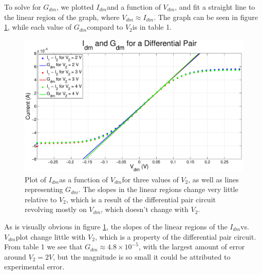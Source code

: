 \documentclass{article}
\newcommand{\Vtwo}{{$V_{2}$}}
\newcommand{\gdm}{{$G_{dm}$}}
\newcommand{\Vdm}{{$V_{dm}$}}
\newcommand{\Idm}{{$I_{dm}$}}
\begin{document}
To solve for \gdm, we plotted \Idm and a function of \Vdm, and fit a straight line to the linear region of the graph, where $V_{dm} \approx I_{dm}$. The graph can be seen in figure \ref{fig:gdm}, while each value of \gdm compard to \Vtwo is in table 1.

\begin{figure}[H]
\centering
\includegraphics[width=\linewidth]{./Figures/Gdm.eps}
\caption{Plot of \Idm as a function of \Vdm for three values of \Vtwo, as well as lines representing \gdm. The slopes in the linear regions change very little relative to \Vtwo, which is a result of the differential pair circuit revolving mostly on \Vdm, which doesn't change with \Vtwo.}
\label{fig:gdm}
\end{figure}


As is visually obvious in figure \ref{fig:gdm}, the slopes of the linear regions of the \Idm vs. \Vdm plot change little with \Vtwo, which is a property of the differential pair circuit. From table 1 we see that $G_{dm} \approx 4.8 \times 10^{-5}$, with the largest amount of error around $V_2 = 2 V$, but the magnitude is so small it could be attributed to experimental error.


\end{document}
